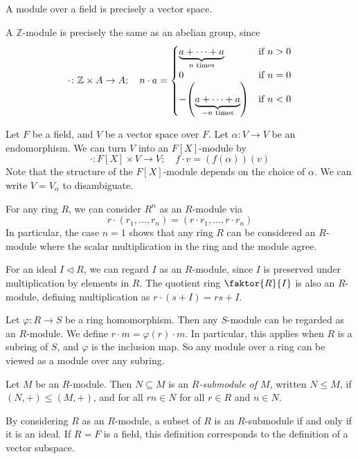 \begin{example}
	A module over a field is precisely a vector space.

	A \( \mathbb Z \)-module is precisely the same as an abelian group, since
	\[
		\cdot \colon \mathbb Z \times A \to A;\quad n \cdot a = \begin{cases}
			\underbrace{a + \dots + a}_{n \text{ times}}         & \text{if } n > 0 \\
			0                                                    & \text{if } n = 0 \\
			-\qty(\underbrace{a + \dots + a}_{-n \text{ times}}) & \text{if } n < 0
		\end{cases}
	\]

	Let \( F \) be a field, and \( V \) be a vector space over \( F \).
	Let \( \alpha \colon V \to V \) be an endomorphism.
	We can turn \( V \) into an \( F[X] \)-module by
	\[
		\cdot \colon F[X] \times V \to V;\quad f \cdot v = (f(\alpha))(v)
	\]
	Note that the structure of the \( F[X] \)-module depends on the choice of \( \alpha \).
	We can write \( V = V_\alpha \) to disambiguate.

	For any ring \( R \), we can consider \( R^n \) as an \( R \)-module via
	\[
		r \cdot (r_1, \dots, r_n) = (r \cdot r_1, \dots, r \cdot r_n)
	\]
	In particular, the case \( n = 1 \) shows that any ring \( R \) can be considered an \( R \)-module where the scalar multiplication in the ring and the module agree.

	For an ideal \( I \vartriangleleft R \), we can regard \( I \) as an \( R \)-module, since \( I \) is preserved under multiplication by elements in \( R \).
	The quotient ring \( \faktor{R}{I} \) is also an \( R \)-module, defining multiplication as \( r \cdot (s+I) = rs + I \).

	Let \( \varphi \colon R \to S \) be a ring homomorphism.
	Then any \( S \)-module can be regarded as an \( R \)-module.
	We define \( r \cdot m = \varphi(r) \cdot m \).
	In particular, this applies when \( R \) is a subring of \( S \), and \( \varphi \) is the inclusion map.
	So any module over a ring can be viewed as a module over any subring.
\end{example}
\begin{definition}
	Let \( M \) be an \( R \)-module.
	Then \( N \subseteq M \) is an \textit{\( R \)-submodule of \( M \)}, written \( N \leq M \), if \( (N, +) \leq (M, +) \), and for all \( rn \in N \) for all \( r \in R \) and \( n \in N \).
\end{definition}
\begin{example}
	By considering \( R \) as an \( R \)-module, a subset of \( R \) is an \( R \)-submodule if and only if it is an ideal.
	If \( R = F \) is a field, this definition corresponds to the definition of a vector subspace.
\end{example}
